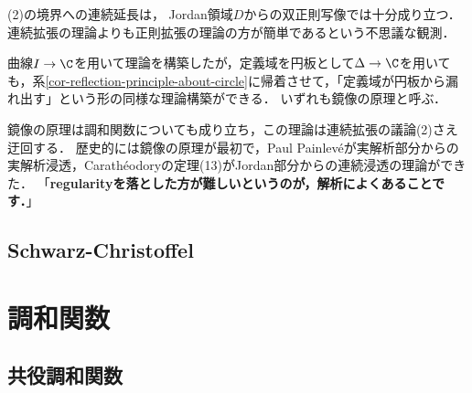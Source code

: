 \documentclass[uplatex, dvipdfmx]{jsreport}
\begin{document}
\begin{remark}
    (2)の境界への連続延長は，
    Jordan領域$D$からの双正則写像では十分成り立つ．
    連続拡張の理論よりも正則拡張の理論の方が簡単であるという不思議な観測．

    曲線$I\to\C$を用いて理論を構築したが，定義域を円板として$\Delta\to\C$を用いても，系\ref{cor-reflection-principle-about-circle}に帰着させて，「定義域が円板から漏れ出す」という形の同様な理論構築ができる．
    いずれも鏡像の原理と呼ぶ．
    
    鏡像の原理は調和関数についても成り立ち，この理論は連続拡張の議論(2)さえ迂回する．
    歴史的には鏡像の原理が最初で，Paul Painlevéが実解析部分からの実解析浸透，Carathéodoryの定理(13)がJordan部分からの連続浸透の理論ができた．
    「\textbf{regularityを落とした方が難しいというのが，解析によくあることです．}」
\end{remark}

\section{Schwarz-Christoffel}

\begin{tcolorbox}[colframe=ForestGreen, colback=ForestGreen!10!white,breakable,colbacktitle=ForestGreen!40!white,coltitle=black,fonttitle=\bfseries\sffamily,
title=上半平面から単体ポリゴンの内部上への共形変換]
    
\end{tcolorbox}

\begin{example}\label{exp-rectangle-and-Jacobi-sn-function}
    
\end{example}

\chapter{調和関数}

\section{共役調和関数}
\end{document}
